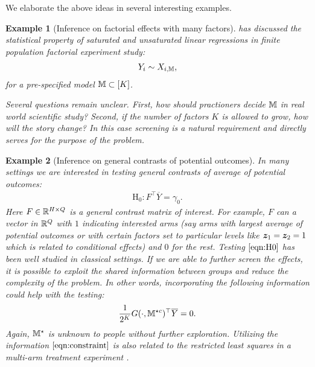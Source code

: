 \documentclass[12pt]{article}
\newtheorem{example}{Example}
\begin{document}
We elaborate the above ideas in several interesting examples.

\begin{example}[Inference on factorial effects with many factors]\label{exp:report-effects}
\cite{zhao2021regression} has discussed the statistical property of saturated and unsaturated linear regressions in finite population factorial experiment study:
\begin{align*}
    Y_i \sim X_{i,{\mathbb{M}}}, 
\end{align*}
for a pre-specified model ${\mathbb{M}} \subset [K]$. 

Several questions remain unclear. First, how should practioners decide ${\mathbb{M}}$ in real world scientific study? Second, if the number of factors $K$ is allowed to grow, how will the story change? In this case  screening is a natural requirement and directly serves for the purpose of the problem.
\end{example}


\begin{example}[Inference on general contrasts of potential outcomes]\label{exp:general-contrasts}
In many settings we are interested in testing general contrasts of average of potential outcomes:
\begin{align}
    \text{H}_0: F^\top \overline{Y} = \gamma_0. \label{eqn:H0}
\end{align}
Here $F\in{\mathbb{R}}^{H\times Q}$ is a general contrast matrix of interest. For example, $F$ can a vector in ${\mathbb{R}}^Q$ with $1$ indicating interested arms (say arms with largest average of potential outcomes or with certain factors set to particular levels like ${\boldsymbol{z}}_1 = {\boldsymbol{z}}_2 = 1$ which is related to conditional effects) and $0$ for the rest. Testing $\eqref{eqn:H0}$ has been well studied in classical settings.   If we are able to further screen the effects, it is possible to exploit the shared information between groups and reduce the complexity of the problem. In other words, incorporating the following information could help with the testing:
\begin{align}
 \frac{1}{2^K}G(\cdot,{{\mathbb{M}}^{\star c}})^\top \overline{Y} = 0. \label{eqn:constraint}
\end{align}
Again, ${\mathbb{M}}^\star$ is unknown to people without further exploration.  Utilizing the information $\eqref{eqn:constraint}$ is also related to the restricted least squares in a multi-arm treatment experiment \citep{zhao2021covariate}. \end{example}
\end{document}
